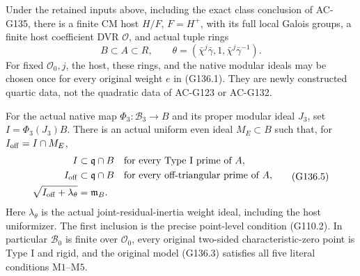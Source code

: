 \begin{theorem}
\label{AC-G136-quartic-model}
Under the retained inputs above, including the exact class
conclusion of AC-G135, there is a finite CM host \(H/F\),
\(F=H^+\), with its full local Galois groups, a finite host
coefficient DVR \(\mathcal O\), and actual tuple rings
\[
 B\subset A\subset R,\qquad
 \theta=(\bar\chi^j\bar\gamma,1,
                         \bar\chi^j\bar\gamma^{-1}).
 \tag{G136.4}
\]
For fixed \(\mathcal O_0,j\), the host, these rings, and the
native modular ideals may be chosen once for every original
weight \(e\) in (G136.1).  They are newly constructed quartic
data, not the quadratic data of AC-G123 or AC-G132.

For the actual native map \(\Phi_3:\mathcal B_3\to B\) and
its proper modular ideal \(J_3\), set
\(I=\Phi_3(J_3)B\).  There is an actual uniform even ideal
\(M_E\subset B\) such that, for \(I_{\rm off}=I\cap M_E\),
\[
 \begin{aligned}
 I&\subset\mathfrak q\cap B
       &&\text{for every Type I prime of }A,\\
 I_{\rm off}&\subset\mathfrak q\cap B
       &&\text{for every off-triangular prime of }A,\\
 \sqrt{I_{\rm off}+\lambda_\theta}&=\mathfrak m_B.
 \end{aligned}
 \tag{G136.5}
\]
Here \(\lambda_\theta\) is the actual joint-residual-inertia
weight ideal, including the host uniformizer.
The first inclusion is the precise point-level condition
(G110.2).  In particular
\(\mathscr B_0\) is finite over \(\mathcal O_0\), every original
two-sided characteristic-zero point is Type I and rigid, and
the original model (G136.3) satisfies all five literal
conditions \(\mathrm{M1}\)--\(\mathrm{M5}\).


\end{theorem}
